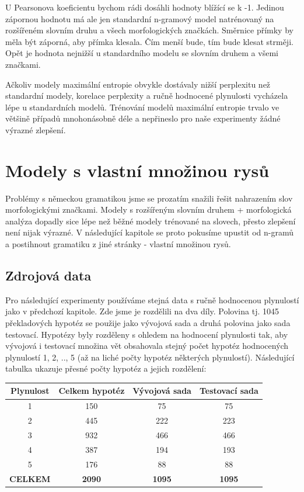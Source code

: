\documentclass[12pt,a4paper]{report}
\begin{document}
U Pearsonova koeficientu bychom rádi dosáhli hodnoty blížící se k -1. Jedinou zápornou hodnotu má ale jen standardní n-gramový model natrénovaný na rozšířeném slovním druhu a všech morfologických značkách. Směrnice přímky by měla být záporná, aby přímka klesala. Čím menší bude, tím bude klesat strměji. Opět je hodnota nejnižší u standardního modelu se slovním druhem a všemi značkami.

Ačkoliv modely maximální entropie obvykle dostávaly nižší perplexitu než standardní modely, korelace perplexity a ručně hodnocené plynulosti vycházela lépe u standardních modelů. Trénování modelů maximální entropie trvalo ve většině případů mnohonásobně déle a nepřineslo pro naše experimenty žádné výrazné zlepšení.


\chapter{Modely s vlastní množinou rysů}
Problémy s německou gramatikou jsme se prozatím snažili řešit nahrazením slov morfologickými značkami. Modely s rozšířeným slovním druhem + morfologická analýza dopadly sice lépe než běžné modely trénované na slovech, přesto zlepšení není nijak výrazné. V následující kapitole se proto pokusíme upustit od n-gramů a postihnout gramatiku z jiné stránky - vlastní množinou rysů.

\section{Zdrojová data}

Pro následující experimenty používáme stejná data s ručně hodnocenou plynulostí jako v předchozí kapitole. Zde jsme je rozdělili na dva díly. Polovina tj. 1045 překladových hypotéz se použije jako vývojová sada a druhá polovina jako sada testovací. Hypotézy byly rozděleny s ohledem na hodnocení plynulosti tak, aby vývojová i testovací množina vět obsahovala stejný počet hypotéz hodnocených plynulostí 1, 2, .., 5 (až na liché počty hypotéz některých plynulostí). Následující tabulka ukazuje přesné počty hypotéz a jejich rozdělení:

\begin{center}\begin{tabular}{|c|c|c|c|}
	\hline
	\textbf{Plynulost} & \textbf{Celkem hypotéz} & \textbf{Vývojová sada} & \textbf{Testovací sada}\\
	\hline
	1 & 150 & 75 & 75\\
	\hline
	2 & 445 & 222 & 223\\
	\hline
	3 & 932 & 466 & 466\\
	\hline
	4 & 387 & 194 & 193\\
	\hline
	5 & 176 & 88 & 88\\
	\hline
	\hline	
	\multicolumn{1}{c}{\textbf{CELKEM}} & \multicolumn{1}{c}{\textbf{2090}} & \multicolumn{1}{c}{\textbf{1095}} & \multicolumn{1}{c}{\textbf{1095}}\\
\end{tabular}\end{center}
\end{document}
